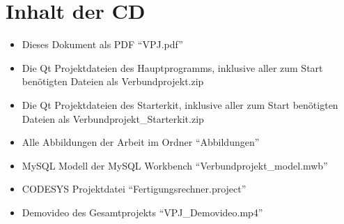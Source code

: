 
\chapter{Inhalt der CD}
\begin{itemize}
    \item Dieses Dokument als PDF "`VPJ.pdf"' \\

    \item Die Qt Projektdateien des Hauptprogramms, inklusive aller zum Start benötigten Dateien als Verbundprojekt.zip \\

    \item Die Qt Projektdateien des Starterkit, inklusive aller zum Start benötigten Dateien als Verbundprojekt\_Starterkit.zip \\
		
    \item Alle Abbildungen der Arbeit im Ordner "`Abbildungen"' \\
		
		\item MySQL Modell der MySQL Workbench "`Verbundprojekt\_model.mwb"' \\ 

		\item CODESYS Projektdatei "`Fertigungsrechner.project"' \\
		
		\item Demovideo des Gesamtprojekts "`VPJ\_Demovideo.mp4"' \\

\end{itemize}
